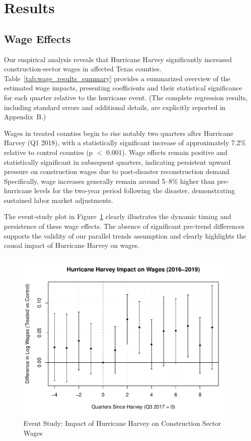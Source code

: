 \documentclass{article}
\begin{document}
\section{Results}

\subsection{Wage Effects}

Our empirical analysis reveals that Hurricane Harvey significantly increased construction-sector wages in affected Texas counties. Table~\ref{tab:wage_results_summary} provides a summarized overview of the estimated wage impacts, presenting coefficients and their statistical significance for each quarter relative to the hurricane event. (The complete regression results, including standard errors and additional details, are explicitly reported in Appendix~B.)

Wages in treated counties begin to rise notably two quarters after Hurricane Harvey (Q1 2018), with a statistically significant increase of approximately 7.2\% relative to control counties (p $<$ 0.001). Wage effects remain positive and statistically significant in subsequent quarters, indicating persistent upward pressure on construction wages due to post-disaster reconstruction demand. Specifically, wage increases generally remain around 5–8\% higher than pre-hurricane levels for the two-year period following the disaster, demonstrating sustained labor market adjustments.

The event-study plot in Figure~\ref{fig:wage_effects} clearly illustrates the dynamic timing and persistence of these wage effects. The absence of significant pre-trend differences supports the validity of our parallel trends assumption and clearly highlights the causal impact of Hurricane Harvey on wages.

\begin{figure}[H]
    \centering
    \includegraphics[width=0.85\linewidth]{Harvey_Impact_Wages.pdf}
    \caption{Event Study: Impact of Hurricane Harvey on Construction Sector Wages}
    \label{fig:wage_effects}
\end{figure}
\end{document}
